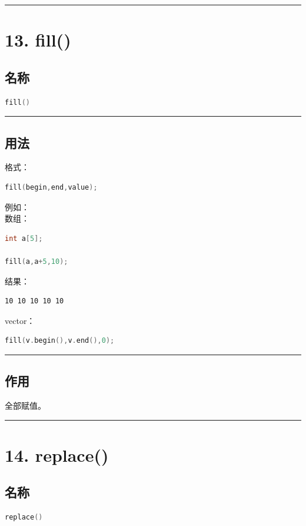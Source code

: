 \documentclass[9pt,twocolumn]{extarticle}
\begin{document}
\noindent\rule{\linewidth}{0.4pt}

\section{13. fill()}

\subsection{名称}
\begin{lstlisting}[language=C++]
fill()
\end{lstlisting}

\noindent\rule{\linewidth}{0.4pt}

\subsection{用法}
格式：
\begin{lstlisting}[language=C++]
fill(begin,end,value);
\end{lstlisting}
例如：\\
数组：
\begin{lstlisting}[language=C++]
int a[5];

fill(a,a+5,10);
\end{lstlisting}
结果：
\begin{lstlisting}
10 10 10 10 10
\end{lstlisting}
vector：
\begin{lstlisting}[language=C++]
fill(v.begin(),v.end(),0);
\end{lstlisting}

\noindent\rule{\linewidth}{0.4pt}

\subsection{作用}
全部赋值。

\noindent\rule{\linewidth}{0.4pt}

\section{14. replace()}

\subsection{名称}
\begin{lstlisting}[language=C++]
replace()
\end{lstlisting}
\end{document}
